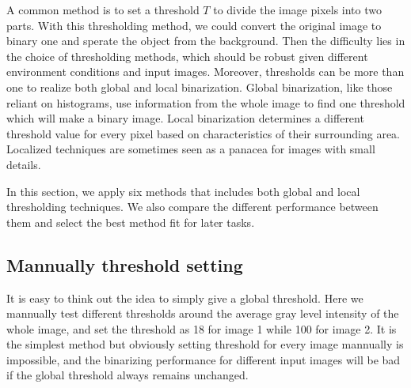 \documentclass[hyperref]{article}
\theoremstyle{nonumberplain}
\begin{document}
	A common method is to set a threshold $T$ to divide the image pixels into two parts. With this thresholding method, we could convert the original image to binary one and sperate the object from the background. Then the difficulty lies in the choice of thresholding methods, which should be robust given different environment conditions and input images. Moreover, thresholds can be more than one to realize both global and local binarization. Global binarization, like those reliant on histograms, use information from the whole image to find one threshold which will make a binary image. Local binarization determines a different threshold value for every pixel based on characteristics of their surrounding area. Localized techniques are sometimes seen as a panacea for images with small details. 
	
	In this section, we apply six methods that includes both global and local thresholding techniques. We also compare the different performance between them and select the best method fit for later tasks.
	
	\subsection{Mannually threshold setting}
	
	\hspace{1.0em}
	It is easy to think out the idea to simply give a global threshold. Here we mannually test different thresholds around the average gray level intensity of the whole image, and set the threshold as 18 for image 1 while 100 for image 2. It is the simplest method but obviously setting threshold for every image mannually is impossible, and the binarizing performance for different input images will be bad if the global threshold always remains unchanged.
	
%	
	
\end{document}
